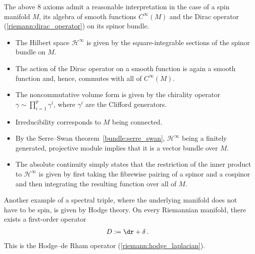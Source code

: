     \begin{example}
        The above 8 axioms admit a reasonable interpretation in the case of a spin manifold $M$, its algebra of smooth functions $C^\infty(M)$ and the Dirac operator (\cref{riemann:dirac_operator}) on its spinor bundle.
        \begin{itemize}
            \item The Hilbert space $\mathcal{H}^\infty$ is given by the square-integrable sections of the spinor bundle on $M$.
            \item The action of the Dirac operator on a smooth function is again a smooth function and, hence, commutes with all of $C^\infty(M)$.
            \item The noncommutative volume form is given by the chirality operator $\gamma\sim\prod_{i=1}^p\gamma^i$, where $\gamma^i$ are the Clifford generators.
            \item Irreducibility corresponds to $M$ being connected.
            \item By the Serre--Swan theorem~\ref{bundle:serre_swan}, $\mathcal{H}^\infty$ being a finitely generated, projective module implies that it is a vector bundle over $M$.
            \item The absolute continuity simply states that the restriction of the inner product to $\mathcal{H}^\infty$ is given by first taking the fibrewise pairing of a spinor and a cospinor and then integrating the resulting function over all of $M$.
        \end{itemize}
    \end{example}
    \begin{example}
        Another example of a spectral triple, where the underlying manifold does not have to be spin, is given by Hodge theory. On every Riemannian manifold, there exists a first-order operator
        \begin{gather}
            D:=\dr+\delta\,.
        \end{gather}
        This is the Hodge--de Rham operator (\cref{riemann:hodge_laplacian}).
    \end{example}

